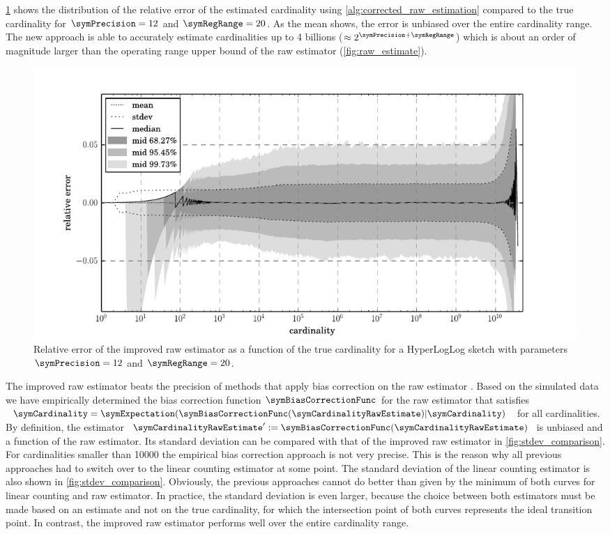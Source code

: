 \documentclass[a4paper]{scrartcl}
\begin{document}
\cref{fig:raw_corrected_estimation_error_12_20} shows the distribution of the relative error of the estimated cardinality using \cref{alg:corrected_raw_estimation} compared to the true cardinality for $\symPrecision=12$ and $\symRegRange=20$. As the mean shows, the error is unbiased over the entire cardinality range. The new approach is able to accurately estimate cardinalities up to 4 billions ($\approx 2^{\symPrecision+\symRegRange}$) which is about an order of magnitude larger than the operating range upper bound of the raw estimator (\cref{fig:raw_estimate}).

\begin{figure}
\centering
\includegraphics[width=1\textwidth]{raw_corrected_estimate_12_20}
\caption{Relative error of the improved raw estimator as a function of the true cardinality for a HyperLogLog sketch with parameters $\symPrecision = 12$ and $\symRegRange=20$.}
\label{fig:raw_corrected_estimation_error_12_20}
\end{figure}

The improved raw estimator beats the precision of methods that apply bias correction on the raw estimator \cite{Heule2013,Rhodes2015,Sanfilippo2014}.
Based on the simulated data we have empirically determined the bias correction function $\symBiasCorrectionFunc$ for the raw estimator that satisfies $\symCardinality = \symExpectation(\symBiasCorrectionFunc(\symCardinalityRawEstimate)\vert\symCardinality)$ for all cardinalities. By definition, 
the estimator $\symCardinalityRawEstimate':=\symBiasCorrectionFunc(\symCardinalityRawEstimate)$ is unbiased and a function of the raw estimator. Its standard deviation can be compared with that of the improved raw estimator in \cref{fig:stdev_comparison}. For cardinalities smaller than \num{10000} the empirical bias correction approach is not very precise. This is the reason why all previous approaches had to switch over to the linear counting estimator at some point. The standard deviation of the linear counting estimator is also shown in \cref{fig:stdev_comparison}. Obviously, the previous approaches cannot do better than given by the minimum of both curves for linear counting and raw estimator. In practice, the standard deviation is even larger, because the choice between both estimators must be made based on an estimate and not on the true cardinality, for which the intersection point of both curves represents the ideal transition point. In contrast, the improved raw estimator performs well over the entire cardinality range.
\end{document}
